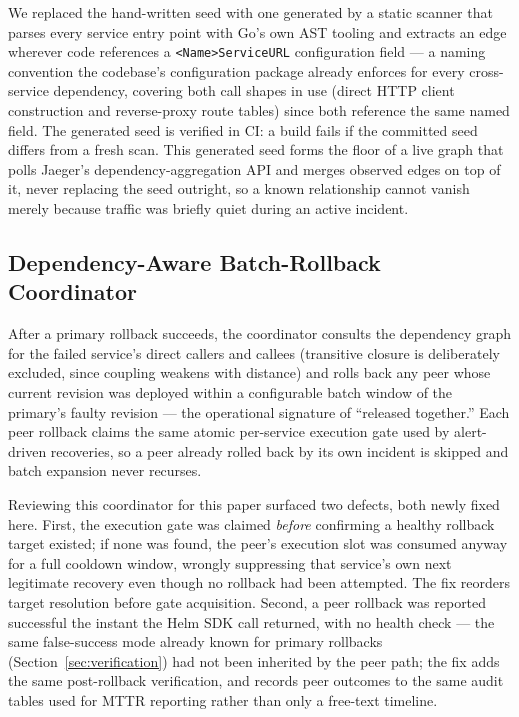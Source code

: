 \documentclass[conference]{IEEEtran}
\begin{document}
We replaced the hand-written seed with one generated by a static scanner that parses every service entry point with Go's own AST tooling and extracts an edge wherever code references a \texttt{<Name>ServiceURL} configuration field --- a naming convention the codebase's configuration package already enforces for every cross-service dependency, covering both call shapes in use (direct HTTP client construction and reverse-proxy route tables) since both reference the same named field. The generated seed is verified in CI: a build fails if the committed seed differs from a fresh scan. This generated seed forms the floor of a live graph that polls Jaeger's dependency-aggregation API and merges observed edges on top of it, never replacing the seed outright, so a known relationship cannot vanish merely because traffic was briefly quiet during an active incident.

\subsection{Dependency-Aware Batch-Rollback Coordinator}
After a primary rollback succeeds, the coordinator consults the dependency graph for the failed service's direct callers and callees (transitive closure is deliberately excluded, since coupling weakens with distance) and rolls back any peer whose current revision was deployed within a configurable batch window of the primary's faulty revision --- the operational signature of ``released together.'' Each peer rollback claims the same atomic per-service execution gate used by alert-driven recoveries, so a peer already rolled back by its own incident is skipped and batch expansion never recurses.

Reviewing this coordinator for this paper surfaced two defects, both newly fixed here. First, the execution gate was claimed \emph{before} confirming a healthy rollback target existed; if none was found, the peer's execution slot was consumed anyway for a full cooldown window, wrongly suppressing that service's own next legitimate recovery even though no rollback had been attempted. The fix reorders target resolution before gate acquisition. Second, a peer rollback was reported successful the instant the Helm SDK call returned, with no health check --- the same false-success mode already known for primary rollbacks (Section~\ref{sec:verification}) had not been inherited by the peer path; the fix adds the same post-rollback verification, and records peer outcomes to the same audit tables used for MTTR reporting rather than only a free-text timeline.
\end{document}
